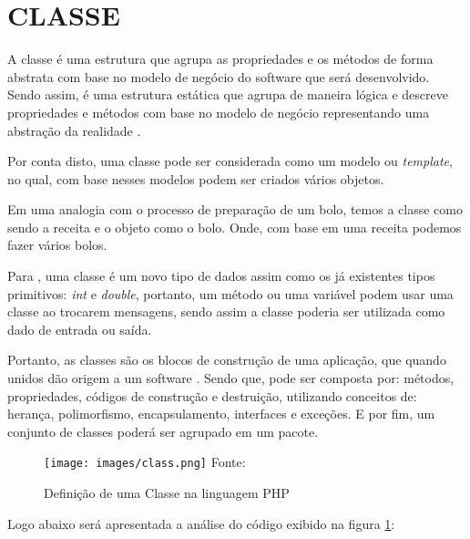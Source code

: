 \section{CLASSE}

A classe é uma estrutura que agrupa as propriedades e os métodos de forma
abstrata com base no modelo de negócio do software que será desenvolvido. 
Sendo assim, é uma estrutura estática que agrupa de maneira lógica e descreve 
propriedades e métodos com base no modelo de negócio representando uma abstração 
da realidade \cite{phpProgramandoComOrientacaoAObjetos}.

Por conta disto, uma classe pode ser considerada como um modelo ou
\textit{template}, no qual, com base nesses modelos podem ser criados vários objetos.

Em uma analogia com o processo de preparação de um bolo, temos a classe como
sendo a receita e o objeto como o bolo. Onde, com base em uma receita podemos fazer 
vários bolos.

Para , uma classe é um novo tipo de dados assim como os já
existentes tipos primitivos: \textit{int} e \textit{double}, portanto, um método
ou uma variável podem usar uma classe ao trocarem mensagens, sendo assim a classe 
poderia ser utilizada como dado de entrada ou saída.

Portanto, as classes são os blocos de construção de uma aplicação, que quando
unidos dão origem a um software \cite{learningJava}. Sendo que, pode ser 
composta por: métodos, propriedades, códigos de construção e destruição, 
utilizando conceitos de: herança, polimorfismo, encapsulamento, interfaces e 
exceções. E por fim, um conjunto de classes poderá ser agrupado em um pacote.

\begin{figure}[h!tb]
	\centering
	\caption{Definição de uma Classe na linguagem PHP}
	\texttt{[image: images/class.png]}
	\label{fig:classe}
	\centering
	\footnotesize Fonte: \fonteOAutor
\end{figure}

\FloatBarrier 	%

Logo abaixo será apresentada a análise do código exibido na
figura \ref{fig:classe}:

